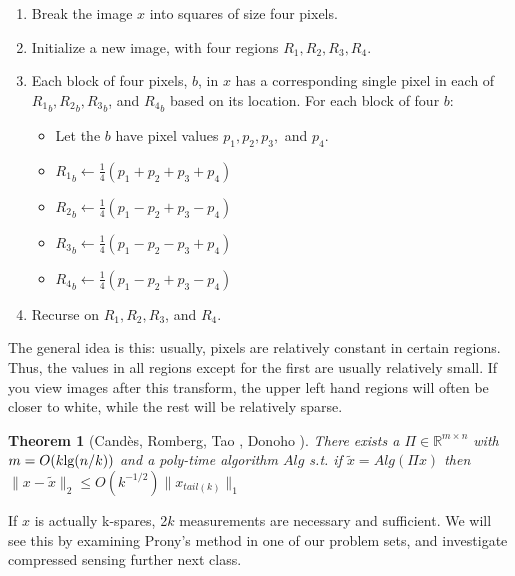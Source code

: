 \documentclass[11pt]{article}
\newcommand{\R}{\mathbb{R}}
\newtheorem{theorem}{Theorem}
\begin{document}
\begin{enumerate}
\item Break the image $x$ into squares of size four pixels.
\item Initialize a new image, with four regions $R_1, R_2, R_3, R_4$.
\item Each block of four pixels, $b$, in $x$ has a corresponding single pixel in each of ${R_1}_b, {R_2}_b, {R_3}_b$, and ${R_4}_b$ based on its location. For each block of four $b$:
\begin{itemize}
\item Let the $b$ have pixel values $p_1, p_2, p_3,$ and $p_4$.
\item ${R_1}_b \leftarrow \frac{1}{4}(p_1 + p_2 + p_3 + p_4)$ 
\item ${R_2}_b \leftarrow \frac{1}{4}(p_1 - p_2 + p_3 - p_4)$ 
\item ${R_3}_b \leftarrow \frac{1}{4}(p_1 - p_2 - p_3 + p_4)$ 
\item ${R_4}_b \leftarrow \frac{1}{4}(p_1 - p_2 + p_3 - p_4)$
\end{itemize}
\item Recurse on $R_1, R_2, R_3$, and $R_4$.
\end{enumerate}

The general idea is this: usually, pixels are relatively constant in certain regions. Thus, the values in all regions except for the first are usually relatively small. If you view images after this transform, the upper left hand regions will often be closer to white, while the rest will be relatively sparse.

\begin{theorem}[Cand{\`{e}}s, Romberg, Tao \cite{CRT06}, Donoho \cite{D06}]
There exists a $\Pi \in \R^{m \times n}$ with $m = O(k \textup{lg}(n / k))$ and a poly-time algorithm $Alg$ s.t. if $\tilde{x} = Alg(\Pi x)$ then $\|x - \tilde{x}\|_2 \leq O(k^{-1/2}) \|x_{tail(k)}\|_1$
\end{theorem}

If $x$ is actually k-spares, 2$k$ measurements are necessary and sufficient. We will see this by examining Prony's method in one of our problem sets, and investigate compressed sensing further next class.


\end{document}

